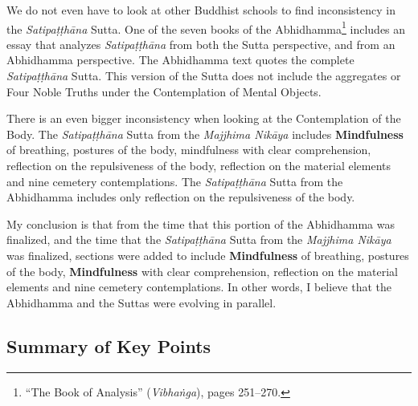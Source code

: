 We do not even have to look at other Buddhist schools to find inconsistency in the \textit{Satipaṭṭhāna} Sutta. One of the seven books of the Abhidhamma\footnote{“The Book of Analysis” (\textit{Vibhaṅga}), pages 251--270.} includes an essay that analyzes \textit{Satipaṭṭhāna} from both the Sutta perspective, and from an Abhidhamma perspective. The Abhidhamma text quotes the complete \textit{Satipaṭṭhāna} Sutta. This version of the Sutta does not include the aggregates or Four Noble Truths under the Contemplation of Mental Objects.

There is an even bigger inconsistency when looking at the Contemplation of the Body. The \textit{Satipaṭṭhāna} Sutta from the \textit{Majjhima Nikāya} includes \textbf{Mindfulness} of breathing, postures of the body, mindfulness with clear comprehension, reflection on the repulsiveness of the body, reflection on the material elements and nine cemetery contemplations. The \textit{Satipaṭṭhāna} Sutta from the Abhidhamma includes only reflection on the repulsiveness of the body. 

My conclusion is that from the time that this portion of the Abhidhamma was finalized, and the time that the \textit{Satipaṭṭhāna} Sutta from the \textit{Majjhima Nikāya} was finalized, sections were added to include \textbf{Mindfulness} of breathing, postures of the body, \textbf{Mindfulness} with clear comprehension, reflection on the material elements and nine cemetery contemplations. In other words, I believe that the Abhidhamma and the Suttas were evolving in parallel.

\pagebreak

\subsection*{Summary of Key Points}

